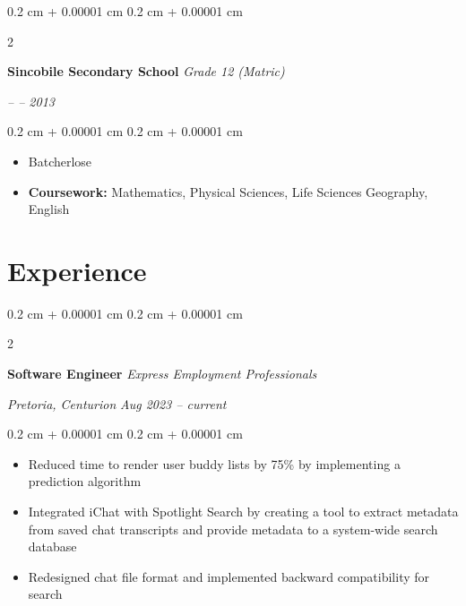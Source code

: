 \documentclass[10pt, letterpaper]{article}
\newenvironment{highlights}{
    \begin{itemize}[
        topsep=0.10 cm,
        parsep=0.10 cm,
        partopsep=0pt,
        itemsep=0pt,
        leftmargin=0.4 cm + 10pt
    ]
}{
    \end{itemize}
} %
\newenvironment{onecolentry}{
    \begin{adjustwidth}{
        0.2 cm + 0.00001 cm
    }{
        0.2 cm + 0.00001 cm
    }
}{
    \end{adjustwidth}
} %
\newenvironment{twocolentry}[2][]{
    \onecolentry
    \def\secondColumn{#2}
    \setcolumnwidth{\fill, 4.5 cm}
    \begin{paracol}{2}
}{
    \switchcolumn \raggedleft \secondColumn
    \end{paracol}
    \endonecolentry
} %
\let\hrefWithoutArrow\href
\renewcommand{\href}[2]{\hrefWithoutArrow{#1}{\ifthenelse{\equal{#2}{}}{ }{#2 }\raisebox{.15ex}{\footnotesize \faExternalLink*}}}
\begin{document}
        \vspace{0.2 cm}

        \begin{twocolentry}{

        \textit{– – 2013}}
            \textbf{Sincobile Secondary School}
            \newline
            \textit{Grade 12 (Matric)}
        \end{twocolentry}

        \vspace{0.10 cm}
        \begin{onecolentry}
            \begin{highlights}
                \item Batcherlose %
                \item \textbf{Coursework:} Mathematics, Physical Sciences, Life Sciences Geography, English
            \end{highlights}
        \end{onecolentry}

    \section{Experience}

        \begin{twocolentry}{
        \textit{Pretoria, Centurion}    
        \newline
        \textit{Aug 2023 – current}}
            \textbf{Software Engineer}
            \newline
            \textit{Express Employment Professionals}
        \end{twocolentry}

        \vspace{0.20 cm}
        \begin{onecolentry}
            \begin{highlights}
                \item Reduced time to render user buddy lists by 75\% by implementing a prediction algorithm
                \item Integrated iChat with Spotlight Search by creating a tool to extract metadata from saved chat transcripts and provide metadata to a system-wide search database
                \item Redesigned chat file format and implemented backward compatibility for search
            \end{highlights}
        \end{onecolentry}
\end{document}
